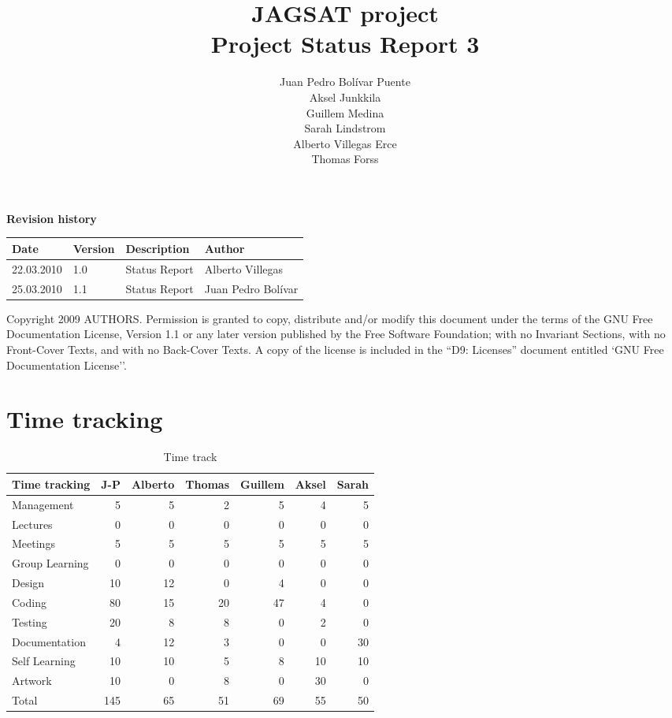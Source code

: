 \documentclass[12pt,a4paper]{article}
\title{\large JAGSAT project\\\huge Project Status Report 3}
\author{
  Juan Pedro Bolívar Puente\\ 
  Aksel Junkkila\\
  Guillem Medina\\ 
  Sarah Lindstrom\\ 
  Alberto Villegas Erce\\ 
  Thomas Forss
}
\begin{document}
\maketitle

\begin{center}
\textbf{Revision history}

\begin{tabular}{ l | l | l | l }
Date			&Version	&Description		&Author\\\hline\hline
22.03.2010	&1.0		&Status Report		&Alberto
Villegas\\
25.03.2010	&1.1		&Status Report		&Juan Pedro Bolívar
\end{tabular}
\label{tab:rev}
\end{center}

\vfill
Copyright 2009 AUTHORS.
Permission is granted to copy, distribute and/or modify this document under the terms of the GNU Free Documentation License, Version 1.1 or any later version published by the Free Software Foundation;  with no Invariant Sections, with no Front-Cover Texts, and with no Back-Cover Texts. A copy of the license is included in the ``D9: Licenses''  document entitled `GNU Free Documentation License''.

\pagebreak
\tableofcontents
\pagebreak

\section{Time tracking}

\begin{table}[h!]
\small
\begin{tabular}{ l | r | r | r | r | r | r}
Time tracking    &J-P  &Alberto &Thomas &Guillem &Aksel &Sarah\\\hline\hline
Management       &5    &5       &2      &5       &4     &5\\
Lectures         &0    &0       &0      &0       &0     &0\\
Meetings         &5    &5       &5      &5       &5     &5\\
Group Learning   &0    &0       &0      &0       &0     &0\\
Design           &10   &12      &0      &4       &0     &0\\
Coding           &80   &15      &20     &47      &4     &0\\
Testing          &20   &8       &8      &0       &2     &0\\
Documentation    &4    &12      &3      &0       &0     &30\\
Self Learning    &10   &10      &5      &8       &10    &10\\
Artwork          &10   &0       &8      &0       &30    &0\\
Total            &145  &65      &51     &69      &55    &50
\end{tabular}
\caption{Time track}
\label{tab:timetrack}
\end{table}
\end{document}
